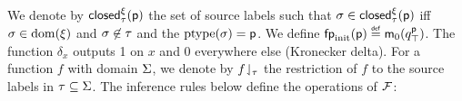 \begin{proofE}
  We denote by $\closedstp{\sources}{\tau}{\ptype}$ the set of source
  labels such that $\asrc \in \closedstp{\sources}{\tau}{\ptype}$ iff
  $\asrc\in\dom{\sources}$ and $\asrc\not\in\tau$ and the
  $\ptypeof{\asrc} = \ptype$.  We define $\fpof{\initmark}(\ptype)
  \isdef \amark_0(q^\ptype_\top)$. The function $\delta_x$ outputs 1
  on $x$ and $0$ everywhere else (Kronecker delta). For a function $f$
  with domain $\sourcelabels$, we denote by $\proj{f}{\tau}$ the
  restriction of $f$ to the source labels in $\tau \subseteq
  \sourcelabels$. The inference rules below define the operations of
  $\algof{F}$: 
  \begin{prooftree}
  \end{prooftree}
  \begin{prooftree}
  \end{prooftree}
  \begin{prooftree}
  \end{prooftree}
  \begin{prooftree}
\end{prooftree}
\end{proofE}
